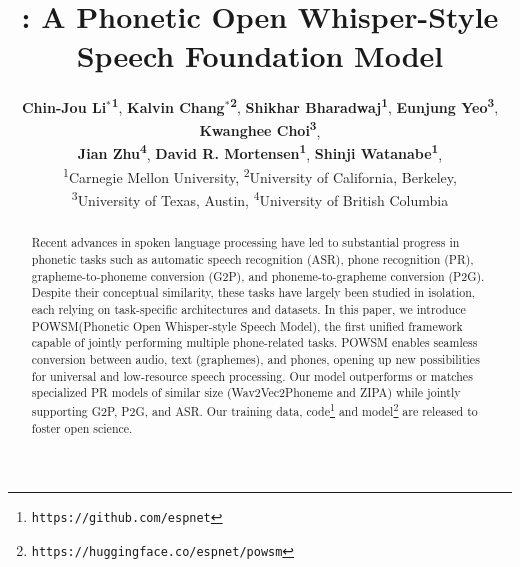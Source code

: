 \documentclass[11pt]{article}
\title{\POWSM: A Phonetic Open Whisper-Style Speech Foundation Model}
\author{
 \textbf{Chin-Jou Li$^*$\textsuperscript{1}},
 \textbf{Kalvin Chang$^*$\textsuperscript{2}},
 \textbf{Shikhar Bharadwaj\textsuperscript{1}},
 \textbf{Eunjung Yeo\textsuperscript{3}},
 \textbf{Kwanghee Choi\textsuperscript{3}},
\\
 \textbf{Jian Zhu\textsuperscript{4}},
 \textbf{David R. Mortensen\textsuperscript{1}},
 \textbf{Shinji Watanabe\textsuperscript{1}},
\\
 \textsuperscript{1}Carnegie Mellon University,
 \textsuperscript{2}University of California, Berkeley,
\\
 \textsuperscript{3}University of Texas, Austin,
 \textsuperscript{4}University of British Columbia
\\
}
\newcommand{\eunjung}[1]{{\color[HTML]{ff4100}[Eunjung: #1]}}
\newcommand{\POWSM}{POWSM\xspace}
\begin{document}
\maketitle


\begin{abstract}
Recent advances in spoken language processing have led to substantial progress in phonetic tasks such as automatic speech recognition (ASR), phone recognition (PR), grapheme-to-phoneme conversion (G2P), and phoneme-to-grapheme conversion (P2G). Despite their conceptual similarity, these tasks have largely been studied in isolation, each relying on task-specific architectures and datasets. 
In this paper, we introduce \POWSM (Phonetic Open Whisper-style Speech Model), the first unified framework capable of jointly performing multiple phone-related tasks. 
\POWSM enables seamless conversion between audio, text (graphemes), and phones, opening up new possibilities for universal and low-resource speech processing.
Our model outperforms or matches specialized PR models of similar size (Wav2Vec2Phoneme and ZIPA) while jointly supporting G2P, P2G, and ASR.
Our training data, code\footnote{\texttt{https://github.com/espnet}} and model\footnote{\texttt{https://huggingface.co/espnet/powsm}} are released to foster open science.


\end{abstract}
\end{document}
